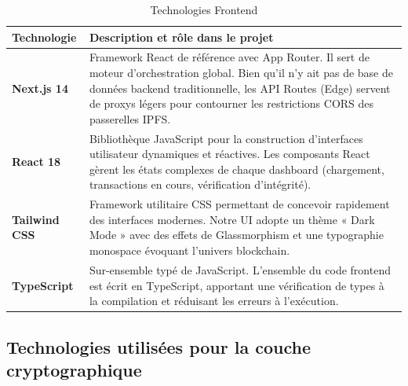 \documentclass[12pt,a4paper]{report}
\begin{document}
\begin{table}[H]
    \centering
    \caption{Technologies Frontend}
    \label{tab:tech_frontend}
    \begin{tabular}{|p{3.5cm}|p{10cm}|}
        \hline
        \textbf{Technologie} & \textbf{Description et rôle dans le projet} \\
        \hline
        \textbf{Next.js 14} & Framework React de référence avec App Router. Il sert de moteur d'orchestration global. Bien qu'il n'y ait pas de base de données backend traditionnelle, les API Routes (Edge) servent de proxys légers pour contourner les restrictions CORS des passerelles IPFS. \\
        \hline
        \textbf{React 18} & Bibliothèque JavaScript pour la construction d'interfaces utilisateur dynamiques et réactives. Les composants React gèrent les états complexes de chaque dashboard (chargement, transactions en cours, vérification d'intégrité). \\
        \hline
        \textbf{Tailwind CSS} & Framework utilitaire CSS permettant de concevoir rapidement des interfaces modernes. Notre UI adopte un thème « Dark Mode » avec des effets de Glassmorphism et une typographie monospace évoquant l'univers blockchain. \\
        \hline
        \textbf{TypeScript} & Sur-ensemble typé de JavaScript. L'ensemble du code frontend est écrit en TypeScript, apportant une vérification de types à la compilation et réduisant les erreurs à l'exécution. \\
        \hline
    \end{tabular}
\end{table}

\subsection{Technologies utilisées pour la couche cryptographique}
\end{document}
